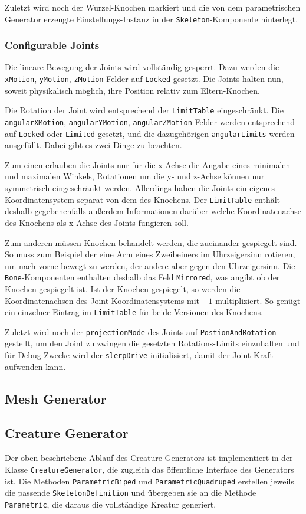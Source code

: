 Zuletzt wird noch der Wurzel-Knochen markiert und die von dem parametrischen Generator erzeugte Einstellungs-Instanz in der \texttt{Skeleton}-Komponente hinterlegt.

\subsubsection{Configurable Joints}
Die lineare Bewegung der Joints wird vollständig gesperrt.
Dazu werden die \texttt{xMotion}, \texttt{yMotion}, \texttt{zMotion} Felder auf \texttt{Locked} gesetzt. Die Joints halten nun, soweit physikalisch möglich, ihre Position relativ zum Eltern-Knochen.

Die Rotation der Joint wird entsprechend der \texttt{Limit\-Table} eingeschränkt.
Die \texttt{angular\-XMotion}, \texttt{angular\-YMotion}, \texttt{angular\-ZMotion} Felder werden entsprechend auf \texttt{Locked} oder \texttt{Limited} gesetzt, und die dazugehörigen \texttt{angularLimits} werden ausgefüllt.
Dabei gibt es zwei Dinge zu beachten.

Zum einen erlauben die Joints nur für die x-Achse die Angabe eines minimalen und maximalen Winkels, Rotationen um die y- und z-Achse können nur symmetrisch eingeschränkt werden.
Allerdings haben die Joints ein eigenes Koordinatensystem separat von dem des Knochens.
Der \texttt{Limit\-Table} enthält deshalb gegebenenfalls außerdem Informationen darüber welche Koordinatenachse des Knochens als x-Achse des Joints fungieren soll.

Zum anderen müssen Knochen behandelt werden, die zueinander gespiegelt sind. So muss zum Beispiel der eine Arm eines Zweibeiners im Uhrzeigersinn rotieren, um nach vorne bewegt zu werden, der andere aber gegen den Uhrzeigersinn. Die \texttt{Bone}-Komponenten enthalten deshalb das Feld \texttt{Mirrored}, was angibt ob der Knochen gespiegelt ist. Ist der Knochen gespiegelt, so werden die Koordinatenachsen des Joint-Koordinatensystems mit \(-1\) multipliziert. So genügt ein einzelner Eintrag im \texttt{Limit\-Table} für beide Versionen des Knochens.

Zuletzt wird noch der \texttt{projectionMode} des Joints auf \texttt{Postion\-And\-Rotation} gestellt, um den Joint zu zwingen die gesetzten Rotations-Limits einzuhalten und für Debug-Zwecke wird der \texttt{slerpDrive} initialisiert, damit der Joint Kraft aufwenden kann.

\subsection{Mesh Generator}

\subsection{Creature Generator}
Der oben beschriebene Ablauf des Creature-Generators ist implementiert in der Klasse \texttt{Creature\-Generator}, die zugleich das öffentliche Interface des Generators ist. Die Methoden \texttt{Parametric\-Biped} und \texttt{Parametric\-Quadruped} erstellen jeweils die passende \texttt{Skeleton\-Definition} und übergeben sie an die Methode \texttt{Parametric}, die daraus die vollständige Kreatur generiert.
